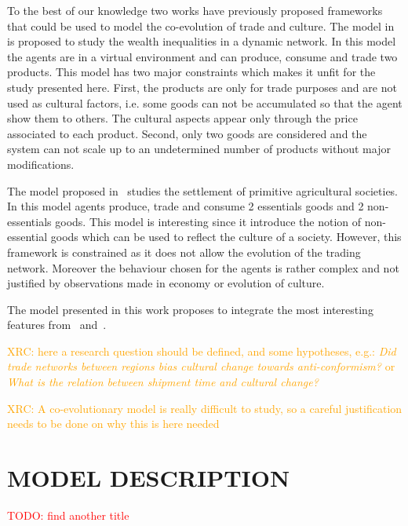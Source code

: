 \documentclass{wscpaperproc}
\newcommand{\memo}[2]{\textcolor{#1}{#2}}
\newcommand{\todo}[1]{\memo{red}{TODO: #1\\}}
\newcommand{\xrc}[1]{\memo{orange}{XRC: #1\\}}
\begin{document}
To the best of our knowledge two works have previously proposed frameworks that could be used to model the co-evolution of trade and culture. The model in~\cite{bentley_specialisation_2005} is proposed to study the wealth inequalities in a dynamic network. In this model the agents are in a virtual environment and can produce, consume and trade two products. This model has two major constraints which makes it unfit for the study presented here. First, the products are only for trade purposes and are not used as cultural factors, i.e. some goods can not be accumulated so that the agent show them to others. The cultural aspects appear only through the price associated to each product. Second, only two goods are considered and the system can not scale up to an undetermined number of products without major modifications.

The model proposed in~\cite{macmillan_agent-based_2008} studies the settlement of primitive agricultural societies. In this model agents produce, trade and consume 2 essentials goods and 2 non-essentials goods. This model is interesting since it introduce the notion of non-essential goods which can be used to reflect the culture of a society. However, this framework is constrained as it does not allow the evolution of the trading network. Moreover the behaviour chosen for the agents is rather complex and not justified by observations made in economy or evolution of culture.

The model presented in this work proposes to integrate the most interesting features from~\cite{bentley_specialisation_2005} and~\cite{macmillan_agent-based_2008}.

\xrc{here a research question should be defined, and some hypotheses, e.g.: \emph{Did trade networks between regions bias cultural change towards anti-conformism?} or \emph{What is the relation between shipment time and cultural change?}}

\xrc{A co-evolutionary model is really difficult to study, so a careful justification needs to be done on why this is here needed}

\section{MODEL DESCRIPTION}

\todo{find another title}
\end{document}
